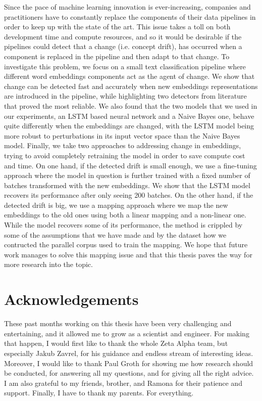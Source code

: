 \documentclass[12pt]{extreport}
\begin{document}
Since the pace of machine learning innovation is ever-increasing, companies and practitioners have to constantly replace the components of their data pipelines in order to keep up with the state of the art. This issue takes a toll on both development time and compute resources, and so it would be desirable if the pipelines could detect that a change (i.e. concept drift), has occurred when a component is replaced in the pipeline and then adapt to that change. To investigate this problem, we focus on a small text classification pipeline where different word embeddings components act as the agent of change. We show that change can be detected fast and accurately when new embeddings representations are introduced in the pipeline, while highlighting two detectors from literature that proved the most reliable. We also found that the two models that we used in our experiments, an LSTM based neural network and a Naive Bayes one, behave quite differently when the embeddings are changed, with the LSTM model being more robust to perturbations in its input vector space than the Naive Bayes model. Finally, we take two approaches to addressing change in embeddings, trying to avoid completely retraining the model in order to save compute cost and time. On one hand, if the detected drift is small enough, we use a fine-tuning approach where the model in question is further trained with a fixed number of batches transformed with the new embeddings. We show that the LSTM model recovers its performance after only seeing 200 batches. On the other hand, if the detected drift is big, we use a mapping approach where we map the new embeddings to the old ones using both a linear mapping and a non-linear one. While the model recovers some of its performance, the method is crippled by some of the assumptions that we have made and by the dataset how we contructed the parallel corpus used to train the mapping. We hope that future work manages to solve this mapping issue and that this thesis paves the way for more research into the topic.

\chapter*{Acknowledgements}

These past months working on this thesis have been very challenging and entertaining, and it allowed me to grow as a scientist and engineer. For making that happen, I would first like to thank the whole Zeta Alpha team, but especially Jakub Zavrel, for his guidance and endless stream of interesting ideas. Moreover, I would like to thank Paul Groth for showing me how research should be conducted, for answering all my questions, and for giving all the right advice. I am also grateful to my friends, brother, and Ramona for their patience and support. Finally, I have to thank my parents. For everything.
\end{document}
